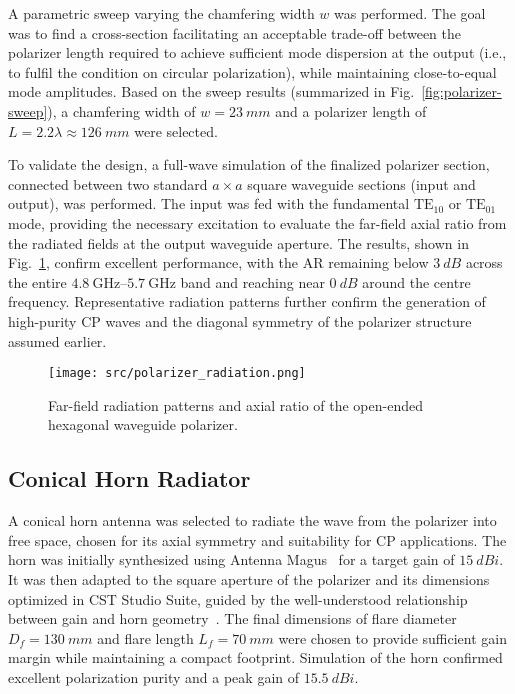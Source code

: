 \documentclass[journal]{IEEEtran}
\newcommand{\frequencyrange}{\qtyrange{4.8}{5.7}{\giga\hertz}}
\newcommand{\TE}[2]{\text{TE}_{#1#2}}
\begin{document}
A parametric sweep varying the chamfering width $w$ was performed. The goal was to find a cross-section facilitating an acceptable trade-off between the polarizer length required to achieve sufficient mode dispersion at the output (i.e., to fulfil the condition on circular polarization), while maintaining close-to-equal mode amplitudes. Based on the sweep results (summarized in Fig.~\ref{fig:polarizer-sweep}), a chamfering width of $w = \qty{23}{mm}$ and a polarizer length of $L = 2.2\lambda \approx \qty{126}{mm}$ were selected.

To validate the design, a full-wave simulation of the finalized polarizer section, connected between two standard $a \times a$ square waveguide sections (input and output), was performed. The input was fed with the fundamental $\TE 10$ or $\TE 01$ mode, providing the necessary excitation to evaluate the far-field axial ratio from the radiated fields at the output waveguide aperture. The results, shown in Fig.~\ref{fig:polarizer-radiation}, confirm excellent performance, with the AR remaining below $\qty{3}{dB}$ across the entire $\frequencyrange$ band and reaching near $\qty{0}{dB}$ around the centre frequency. Representative radiation patterns further confirm the generation of high-purity CP waves and the diagonal symmetry of the polarizer structure assumed earlier.

\begin{figure}
    \centering
    \texttt{[image: src/polarizer\_radiation.png]}
    \caption{\label{fig:polarizer-radiation}Far-field radiation patterns and axial ratio of the open-ended hexagonal waveguide polarizer.}
\end{figure}


\subsection{Conical Horn Radiator}
\label{subsec:conical-horn-radiator}

A conical horn antenna was selected to radiate the wave from the polarizer into free space, chosen for its axial symmetry and suitability for CP applications. The horn was initially synthesized using Antenna Magus~\cite{antenna-magus} for a target gain of $\qty{15}{dBi}$. It was then adapted to the square aperture of the polarizer and its dimensions optimized in CST Studio Suite, guided by the well-understood relationship between gain and horn geometry~\cite{aboserwal-et-al:conical-horn-gain-and-amplitude-patterns}. The final dimensions of flare diameter $D_f = \qty{130}{mm}$ and flare length $L_f = \qty{70}{mm}$ were chosen to provide sufficient gain margin while maintaining a compact footprint. Simulation of the horn confirmed excellent polarization purity and a peak gain of $\qty{15.5}{dBi}$.
\end{document}
